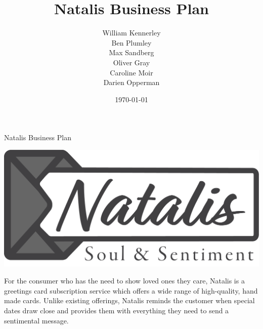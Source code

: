 \documentclass[10pt, a4paper]{article}
\title{Natalis Business Plan}
\author{William Kennerley\\
Ben Plumley\\
Max Sandberg\\
Oliver Gray\\
Caroline Moir\\
Darien Opperman}
\date{\today}
\begin{document}
\begin{titlepage} %

	\centering %

	\scshape %

	\vspace*{\baselineskip} %




	\vspace{0.75\baselineskip} %

	{\Huge Natalis Business Plan} %

	\vspace{0.75\baselineskip} %



	\vspace{2\baselineskip} %

	\includegraphics[width=\linewidth/2]{logo.png}

		\vspace{3\baselineskip} %


For the consumer who has the need to show loved ones they care, Natalis is a greetings card subscription service which offers a wide range of high-quality, hand made cards. Unlike existing offerings, Natalis reminds the customer when special dates draw close and provides them with everything they need to send a sentimental message.

	\vspace*{3\baselineskip} %


\end{titlepage}
\end{document}
